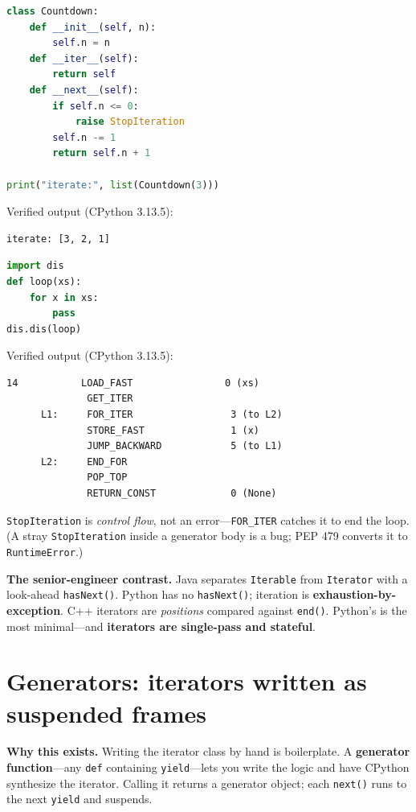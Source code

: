 \begin{lstlisting}[language=Python, caption={A hand-written iterator; for-loops speak exactly this protocol.}]
class Countdown:
    def __init__(self, n):
        self.n = n
    def __iter__(self):
        return self
    def __next__(self):
        if self.n <= 0:
            raise StopIteration
        self.n -= 1
        return self.n + 1

print("iterate:", list(Countdown(3)))
\end{lstlisting}

Verified output (CPython 3.13.5):

\begin{lstlisting}[caption={Output}]
iterate: [3, 2, 1]
\end{lstlisting}

\begin{lstlisting}[language=Python, caption={The bytecode of any for-loop.}]
import dis
def loop(xs):
    for x in xs:
        pass
dis.dis(loop)
\end{lstlisting}

Verified output (CPython 3.13.5):

\begin{lstlisting}[caption={Output}]
 14           LOAD_FAST                0 (xs)
              GET_ITER
      L1:     FOR_ITER                 3 (to L2)
              STORE_FAST               1 (x)
              JUMP_BACKWARD            5 (to L1)
      L2:     END_FOR
              POP_TOP
              RETURN_CONST             0 (None)
\end{lstlisting}

\texttt{StopIteration} is \emph{control flow}, not an error---\texttt{FOR\_ITER} catches it to end
the loop. (A stray \texttt{StopIteration} inside a generator body is a bug; PEP 479 converts it to
\texttt{RuntimeError}.)

\textbf{The senior-engineer contrast.} Java separates \texttt{Iterable} from \texttt{Iterator}
with a look-ahead \texttt{hasNext()}. Python has no \texttt{hasNext()}; iteration is
\textbf{exhaustion-by-exception}. C++ iterators are \emph{positions} compared against
\texttt{end()}. Python's is the most minimal---and \textbf{iterators are single-pass and
stateful}.

\section{Generators: iterators written as suspended frames}

\textbf{Why this exists.} Writing the iterator class by hand is boilerplate. A \textbf{generator
function}---any \texttt{def} containing \texttt{yield}---lets you write the logic and have CPython
synthesize the iterator. Calling it returns a generator object; each \texttt{next()} runs to the
next \texttt{yield} and suspends.

